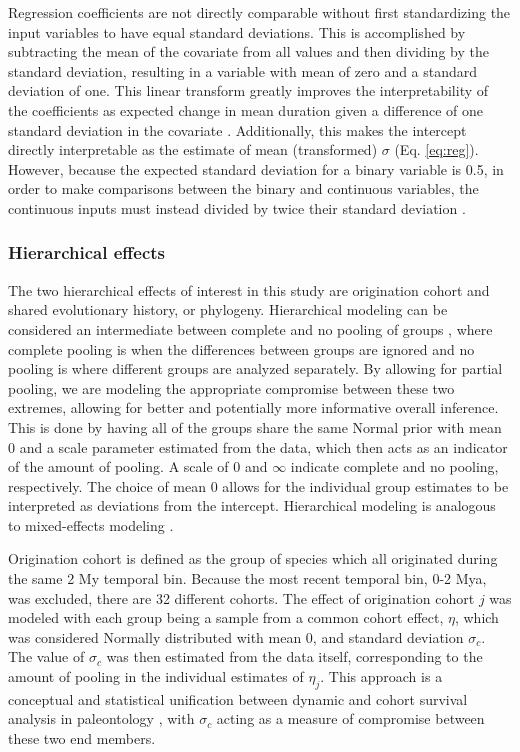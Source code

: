 \documentclass{article}
\begin{document}
Regression coefficients are not directly comparable without first standardizing the input variables to have equal standard deviations. This is accomplished by subtracting the mean of the covariate from all values and then dividing by the standard deviation, resulting in a variable with mean of zero and a standard deviation of one. This linear transform greatly improves the interpretability of the coefficients as expected change in mean duration given a difference of one standard deviation in the covariate \cite{Schielzeth2010}. Additionally, this makes the intercept directly interpretable as the estimate of mean (transformed) \(\sigma\) (Eq. \ref{eq:reg}). However, because the expected standard deviation for a binary variable is 0.5, in order to make comparisons between the binary and continuous variables, the continuous inputs must instead divided by twice their standard deviation \cite{Gelman2008}. 

\subsubsection{Hierarchical effects}

The two hierarchical effects of interest in this study are origination cohort and shared evolutionary history, or phylogeny. Hierarchical modeling can be considered an intermediate between complete and no pooling of groups \cite{Gelman2007}, where complete pooling is when the differences between groups are ignored and no pooling is where different groups are analyzed separately. By allowing for partial pooling, we are modeling the appropriate compromise between these two extremes, allowing for better and potentially more informative overall inference. This is done by having all of the groups share the same Normal prior with mean 0 and a scale parameter estimated from the data, which then acts as an indicator of the amount of pooling. A scale of 0 and \(\infty\) indicate complete and no pooling, respectively. The choice of mean 0 allows for the individual group estimates to be interpreted as deviations from the intercept. Hierarchical modeling is analogous to mixed-effects modeling \cite{Gelman2007}.

Origination cohort is defined as the group of species which all originated during the same 2 My temporal bin. Because the most recent temporal bin, 0-2 Mya, was excluded, there are 32 different cohorts. The effect of origination cohort \(j\) was modeled with each group being a sample from a common cohort effect, \(\eta\), which was considered Normally distributed with mean 0, and standard deviation \(\sigma_{c}\). The value of \(\sigma_{c}\) was then estimated from the data itself, corresponding to the amount of pooling in the individual estimates of \(\eta_{j}\). This approach is a conceptual and statistical unification between dynamic and cohort survival analysis in paleontology \cite{Foote1988,Raup1978,Raup1975,VanValen1979,Baumiller1993}, with \(\sigma_{c}\) acting as a measure of compromise between these two end members.
\end{document}
